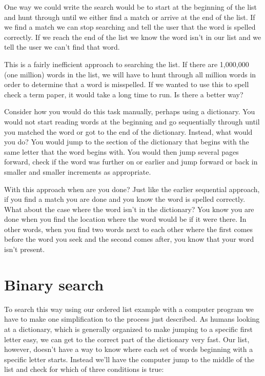 One way we could write the search would be to start at the beginning of the list and hunt through until we either find a match or arrive at the end of the list. If we find a match we can stop searching and tell the user that the word is spelled correctly. If we reach the end of the list we know the word isn't in our list and we tell the user we can't find that word.

This is a fairly inefficient approach to searching the list. If there are 1,000,000 (one million) words in the list, we will have to hunt through all million words in order to determine that a word is misspelled. If we wanted to use this to spell check a term paper, it would take a long time to run. Is there a better way?

Consider how you would do this task manually, perhaps using a dictionary. You would not start reading words at the beginning and go sequentially through until you matched the word or got to the end of the dictionary. Instead, what would you do? You would jump to the section of the dictionary that begins with the same letter that the word begins with. You would then jump several pages forward, check if the word was further on or earlier and jump forward or back in smaller and smaller increments as appropriate.

With this approach when are you done? Just like the earlier sequential approach, if you find a match you are done and you know the word is spelled correctly. What about the case where the word isn't in the dictionary? You know you are done when you find the location where the word would be if it were there. In other words, when you find two words next to each other where the first comes before the word you seek and the second comes after, you know that your word isn't present.

\section{Binary search}

To search this way using our ordered list example with a computer program we have to make one simplification to the process just described. As humans looking at a dictionary, which is generally organized to make jumping to a specific first letter easy, we can get to the correct part of the dictionary very fast. Our list, however, doesn't have a way to know where each set of words beginning with a specific letter starts. Instead we'll have the computer jump to the middle of the list and check for which of three conditions is true:

